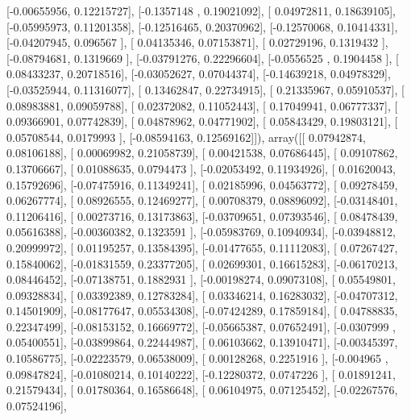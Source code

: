 \documentclass{article}
\begin{document}
       [-0.00655956,  0.12215727],
       [-0.1357148 ,  0.19021092],
       [ 0.04972811,  0.18639105],
       [-0.05995973,  0.11201358],
       [-0.12516465,  0.20370962],
       [-0.12570068,  0.10414331],
       [-0.04207945,  0.096567  ],
       [ 0.04135346,  0.07153871],
       [ 0.02729196,  0.1319432 ],
       [-0.08794681,  0.1319669 ],
       [-0.03791276,  0.22296604],
       [-0.0556525 ,  0.1904458 ],
       [ 0.08433237,  0.20718516],
       [-0.03052627,  0.07044374],
       [-0.14639218,  0.04978329],
       [-0.03525944,  0.11316077],
       [ 0.13462847,  0.22734915],
       [ 0.21335967,  0.05910537],
       [ 0.08983881,  0.09059788],
       [ 0.02372082,  0.11052443],
       [ 0.17049941,  0.06777337],
       [ 0.09366901,  0.07742839],
       [ 0.04878962,  0.04771902],
       [ 0.05843429,  0.19803121],
       [ 0.05708544,  0.0179993 ],
       [-0.08594163,  0.12569162]]), array([[ 0.07942874,  0.08106188],
       [ 0.00069982,  0.21058739],
       [ 0.00421538,  0.07686445],
       [ 0.09107862,  0.13706667],
       [ 0.01088635,  0.0794473 ],
       [-0.02053492,  0.11934926],
       [ 0.01620043,  0.15792696],
       [-0.07475916,  0.11349241],
       [ 0.02185996,  0.04563772],
       [ 0.09278459,  0.06267774],
       [ 0.08926555,  0.12469277],
       [ 0.00708379,  0.08896092],
       [-0.03148401,  0.11206416],
       [ 0.00273716,  0.13173863],
       [-0.03709651,  0.07393546],
       [ 0.08478439,  0.05616388],
       [-0.00360382,  0.1323591 ],
       [-0.05983769,  0.10940934],
       [-0.03948812,  0.20999972],
       [ 0.01195257,  0.13584395],
       [-0.01477655,  0.11112083],
       [ 0.07267427,  0.15840062],
       [-0.01831559,  0.23377205],
       [ 0.02699301,  0.16615283],
       [-0.06170213,  0.08446452],
       [-0.07138751,  0.1882931 ],
       [-0.00198274,  0.09073108],
       [ 0.05549801,  0.09328834],
       [ 0.03392389,  0.12783284],
       [ 0.03346214,  0.16283032],
       [-0.04707312,  0.14501909],
       [-0.08177647,  0.05534308],
       [-0.07424289,  0.17859184],
       [ 0.04788835,  0.22347499],
       [-0.08153152,  0.16669772],
       [-0.05665387,  0.07652491],
       [-0.0307999 ,  0.05400551],
       [-0.03899864,  0.22444987],
       [ 0.06103662,  0.13910471],
       [-0.00345397,  0.10586775],
       [-0.02223579,  0.06538009],
       [ 0.00128268,  0.2251916 ],
       [-0.004965  ,  0.09847824],
       [-0.01080214,  0.10140222],
       [-0.12280372,  0.0747226 ],
       [ 0.01891241,  0.21579434],
       [ 0.01780364,  0.16586648],
       [ 0.06104975,  0.07125452],
       [-0.02267576,  0.07524196],
\end{document}
